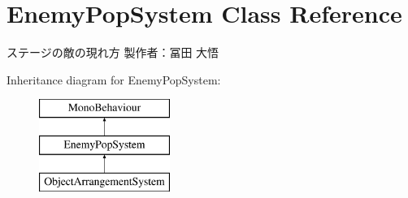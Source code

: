 \hypertarget{class_enemy_pop_system}{}\section{Enemy\+Pop\+System Class Reference}
\label{class_enemy_pop_system}


ステージの敵の現れ方 製作者：冨田 大悟  


Inheritance diagram for Enemy\+Pop\+System\+:\begin{figure}[H]
\begin{center}
\leavevmode
\includegraphics[height=3.000000cm]{class_enemy_pop_system}
\end{center}
\end{figure}
